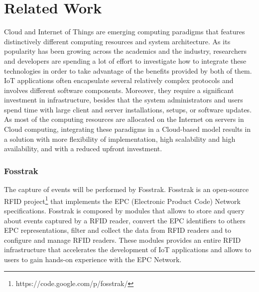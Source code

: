 \section{Related Work}
\label{sec:related_work}
Cloud and Internet of Things are emerging computing paradigms that features distinctively different computing resources
and system architecture. As its popularity has been growing across the academics and the industry, researchers and developers
are spending a lot of effort to investigate how to integrate these technologies in order to take advantage of the benefits
provided by both of them.\\
IoT applications often encapsulate several relatively complex protocols and involves different software components. Moreover,
they require a significant investment in infrastructure, besides that the system administrators and users spend time with large
client and server installations, setups, or software updates. As most of the computing resources are allocated on the Internet on servers
in Cloud computing, integrating these paradigms in a Cloud-based model results in a solution with more flexibility of implementation,
high scalability and high availability, and with a reduced upfront investment.\\

\subsubsection{Fosstrak}
\label{subs:fosstrak}
The capture of events will be performed by Fosstrak. Fosstrak is an open-source RFID project\footnote{https://code.google.com/p/fosstrak/} that implements the
EPC (Electronic Product Code) Network specifications. Fosstrak is composed by modules that allows to store and query about events captured by a RFID reader,
convert the EPC identifiers to others EPC representations, filter and collect the data from RFID readers and to configure and manage RFID readers. These modules
provides an entire RFID infrastructure that accelerates the development of IoT applications and allows to users to gain hands-on experience with the EPC Network.\\

